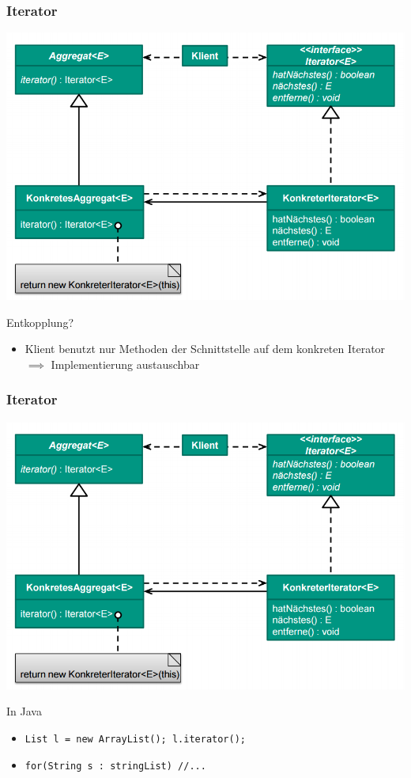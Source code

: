 \documentclass[18pt]{beamer}
\begin{document}
	\begin{frame}
		\frametitle{Iterator}
		\centering
		\includegraphics[scale=0.35]{./pics/tut3/iter.png}
		\begin{block}{Entkopplung?}
			\begin{itemize}
				\pause 
				\item Klient benutzt nur Methoden der Schnittstelle auf dem konkreten Iterator \linebreak $\implies$ Implementierung austauschbar
			\end{itemize}
		\end{block}
	\end{frame}
	
	\begin{frame}
		\frametitle{Iterator}
		\centering
		\includegraphics[scale=0.35]{./pics/tut3/iter.png}
		\begin{block}{In Java}
			\begin{itemize}
				\item \texttt{List l = new ArrayList(); l.iterator();} 
				\item \texttt{for(String s : stringList) //...}
			\end{itemize}
		\end{block}
	\end{frame}
\end{document}
